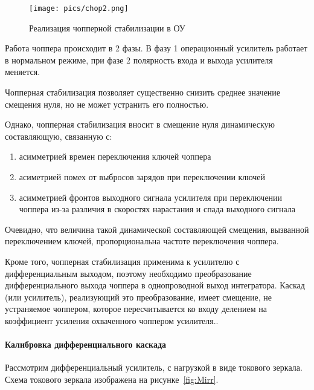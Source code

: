 \documentclass[a4paper,12pt,oneside]{scrartcl}
\begin{document}
\begin{figure}[!htb]
\centering
\texttt{[image: pics/chop2.png]}
\caption{Реализация чопперной стабилизации в ОУ}
\label{fig:chop2}
\end{figure}
\FloatBarrier

Работа чоппера происходит в 2 фазы. В фазу 1 операционный усилитель работает в нормальном режиме, при фазе 2 полярность входа и выхода усилителя меняется.

Чопперная стабилизация позволяет существенно снизить среднее значение смещения нуля, но не может устранить его полностью. 

Однако, чопперная стабилизация вносит в смещение нуля динамическую составляющую, связанную с:

\begin{enumerate}
    \item асимметрией времен переключения ключей чоппера
	\item асиметрией помех от выбросов зарядов при переключении ключей
	\item асимметрией фронтов выходного сигнала усилителя при переключении чоппера из-за различия в скоростях нарастания и спада выходного сигнала
\end{enumerate}

Очевидно, что величина такой динамической составляющей смещения, вызванной переключением ключей, пропорциональна частоте переключения чоппера.

Кроме того, чопперная стабилизация применима к усилителю с дифференциальным выходом, поэтому необходимо преобразование  дифференциального выхода чоппера в однопроводной выход интегратора. Каскад (или усилитель), реализующий это преобразование,  имеет смещение, не устраняемое чоппером, которое пересчитывается ко входу делением на коэффициент усиления охваченного чоппером усилителя..~\cite{B10}







\paragraph{Калибровка дифференциального каскада}

Рассмотрим дифференциальный усилитель, с нагрузкой в виде токового зеркала. Схема токового зеркала изображена на рисунке~\ref{fig:Mirr}.
\end{document}
